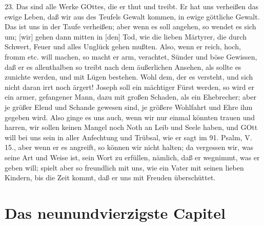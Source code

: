 23. Das sind alle Werke GOttes, die er thut und treibt. Er hat uns verheißen das ewige Leben, daß wir aus des Teufels Gewalt kommen, in ewige göttliche Gewalt. Das ist uns in der Taufe verheißen; aber wenn es soll angehen, so wendet es sich um; [wir] gehen dann mitten in [den] Tod, wie die lieben Märtyrer, die durch Schwert, Feuer und alles Unglück gehen mußten. Also, wenn er reich, hoch, fromm etc. will machen, so macht er arm, verachtet, Sünder und böse Gewissen, daß er es allenthalben so treibt nach dem äußerlichen Ansehen, als sollte es zunichte werden, und mit Lügen bestehen. Wohl dem, der es versteht, und sich nicht daran irrt noch ärgert! Joseph soll ein mächtiger Fürst werden, so wird er ein armer, gefangener Mann, dazu mit großen Schaden, als ein Ehebrecher; aber je größer Elend und Schande gewesen sind, je größere Wohlfahrt und Ehre ihm gegeben wird. Also ginge es uns auch, wenn wir nur einmal könnten trauen und harren, wir sollen keinen Mangel noch Noth an Leib und Seele haben, und GOtt will bei uns sein in aller Anfechtung und Trübsal, wie er sagt im 91. Psalm, V. 15., aber wenn er es angreift, so können wir nicht halten; da vergessen wir, was seine Art und Weise ist, sein Wort zu erfüllen, nämlich, daß er wegnimmt, was er geben will; spielt aber so freundlich mit uns, wie ein Vater mit seinen lieben Kindern, bis die Zeit kommt, daß er uns mit Freuden überschüttet.

\section{Das neunundvierzigste Capitel}

